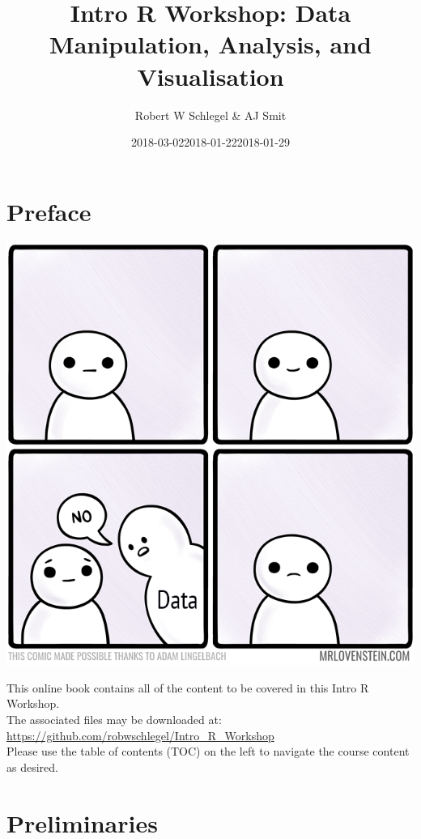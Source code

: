 \documentclass[]{book}
\title{Intro R Workshop: Data Manipulation, Analysis, and Visualisation}
\author{Robert W Schlegel \& AJ Smit}
\date{2018-03-02}
\date{2018-01-22}
\date{2018-01-29}
\theoremstyle{definition}
\theoremstyle{definition}
\theoremstyle{definition}
\theoremstyle{remark}
\begin{document}
\maketitle

{
\setcounter{tocdepth}{1}
\tableofcontents
}
\chapter*{Preface}\label{preface}

\begin{center}\includegraphics[width=1\linewidth]{figures/769_life_finds_a_way} \end{center}

This online book contains all of the content to be covered in this Intro
R Workshop.\\
The associated files may be downloaded at:
\url{https://github.com/robwschlegel/Intro_R_Workshop}\\
Please use the table of contents (TOC) on the left to navigate the
course content as desired.

\chapter{Preliminaries}\label{prelim}
\end{document}
